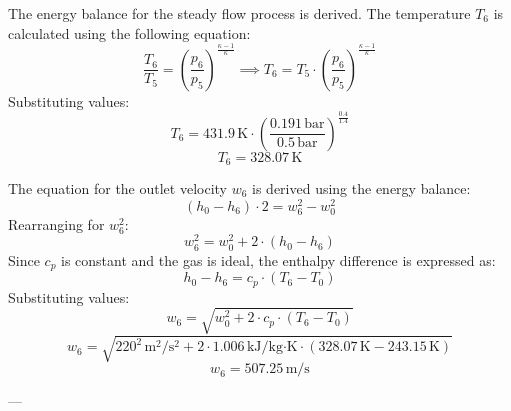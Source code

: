 The energy balance for the steady flow process is derived. The temperature \( T_6 \) is calculated using the following equation:  
\[
\frac{T_6}{T_5} = \left( \frac{p_6}{p_5} \right)^{\frac{\kappa - 1}{\kappa}} \implies T_6 = T_5 \cdot \left( \frac{p_6}{p_5} \right)^{\frac{\kappa - 1}{\kappa}}
\]  
Substituting values:  
\[
T_6 = 431.9 \, \text{K} \cdot \left( \frac{0.191 \, \text{bar}}{0.5 \, \text{bar}} \right)^{\frac{0.4}{1.4}}
\]  
\[
T_6 = 328.07 \, \text{K}
\]

The equation for the outlet velocity \( w_6 \) is derived using the energy balance:  
\[
(h_0 - h_6) \cdot 2 = w_6^2 - w_0^2
\]  
Rearranging for \( w_6^2 \):  
\[
w_6^2 = w_0^2 + 2 \cdot (h_0 - h_6)
\]  
Since \( c_p \) is constant and the gas is ideal, the enthalpy difference is expressed as:  
\[
h_0 - h_6 = c_p \cdot (T_6 - T_0)
\]  
Substituting values:  
\[
w_6 = \sqrt{w_0^2 + 2 \cdot c_p \cdot (T_6 - T_0)}
\]  
\[
w_6 = \sqrt{220^2 \, \text{m}^2/\text{s}^2 + 2 \cdot 1.006 \, \text{kJ}/\text{kg·K} \cdot (328.07 \, \text{K} - 243.15 \, \text{K})}
\]  
\[
w_6 = 507.25 \, \text{m/s}
\]  

---